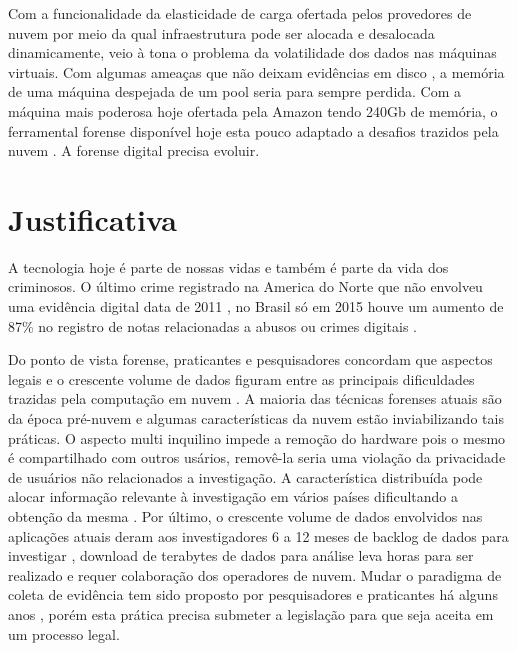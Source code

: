 \documentclass[
	12pt,				%
	openright,			%
	oneside,			%
	a4paper,			%
	english,			%
	french,				%
	spanish,			%
	brazil,				%
	]{abntex2}
\begin{document}
\par

Com a funcionalidade da elasticidade de carga ofertada pelos provedores de nuvem por meio da qual infraestrutura pode ser alocada e desalocada dinamicamente, veio à tona o problema
da volatilidade dos dados nas máquinas virtuais. Com algumas ameaças que não deixam evidências em disco \cite{Aljaedi2011}, a memória de uma máquina despejada de um pool seria para sempre
perdida. Com a máquina mais poderosa hoje ofertada pela Amazon tendo 240Gb de memória, o ferramental forense disponível hoje esta pouco adaptado a desafios trazidos 
pela nuvem \cite{Dykstra2012a}. A forense digital precisa evoluir.

\chapter{Justificativa}

A tecnologia hoje é parte de nossas vidas e também é parte da vida dos criminosos. O último crime registrado na America do Norte que não envolveu uma evidência digital data de 2011 \cite{Quick2014}
, no Brasil só em 2015 houve um aumento de 87\% no registro de notas relacionadas a abusos ou crimes digitais \cite{cnbsp}.

\par

Do ponto de vista forense, praticantes e pesquisadores concordam que aspectos legais e o crescente volume de dados figuram entre as principais dificuldades trazidas pela computação 
em nuvem \cite{Bash2015a}. A maioria das técnicas forenses atuais são da época pré-nuvem e algumas características da nuvem estão inviabilizando tais práticas. O aspecto multi inquilino 
impede a remoção do hardware pois o mesmo é compartilhado com outros usários, removê-la seria uma violação da privacidade de usuários não relacionados a investigação. A característica
 distribuída pode alocar informação relevante à investigação em vários países dificultando a obtenção da mesma \cite{Dykstra2012a}. Por último, o crescente volume de dados envolvidos nas 
 aplicações atuais deram aos investigadores 6 a 12 meses de backlog de dados para investigar \cite{Quick2014}, download de terabytes de dados para análise leva horas para ser realizado e 
 requer colaboração dos operadores de nuvem. Mudar o paradigma de coleta de evidência tem sido proposto por pesquisadores e praticantes há alguns anos \cite{Birk2011}\cite{Sang2013} , porém esta prática precisa 
 submeter a legislação para que seja aceita em um processo legal.
\end{document}
